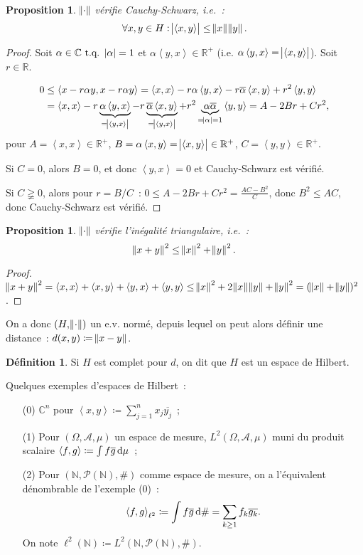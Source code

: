 \documentclass{report}
\newcommand{\C}{{\mathbb C}}
\newcommand{\R}{{\mathbb R}}
\newcommand{\N}{{\mathbb N}}
\newcommand{\scpr}[2]{\left\langle#1, #2\right\rangle}
\newcommand{\tq}{\text{ t.q. }}
\newtheorem{prp}[thm]{Proposition}
\theoremstyle{definition}
\newtheorem{déf}[thm]{Définition}
\theoremstyle{remark}
\begin{document}
\begin{prp} $\norm \cdot$ vérifie Cauchy-Schwarz, i.e.~:
\[\forall x, y \in H : \abs {\scpr xy} \leq \norm x\norm y.\]
\end{prp}

\begin{proof} Soit $\alpha \in \C \tq \abs \alpha = 1$ et $\alpha\scpr yx \in \R^+$ (i.e. $\alpha\scpr yx = \abs {\scpr xy}$). Soit $r \in \R$.

\begin{align*}
	0 &\leq \scpr {x-r\alpha y}{x-r\alpha y} = \scpr xx - r\alpha\scpr yx - r\overline \alpha\scpr xy + r^2\scpr yy \\
		&= \scpr xx - r\underbrace {\alpha \scpr yx}_{= \abs {\scpr yx}} - r\underbrace {\overline \alpha \scpr xy}_{= \abs {\scpr yx}} + r^2\underbrace {\alpha\overline\alpha}_{= \abs \alpha = 1} \scpr yy = A - 2Br + Cr^2,
\end{align*}
pour $A = \scpr xx \in \R^+$, $B = \alpha\scpr xy = \abs {\scpr xy} \in \R^+$, $C = \scpr yy \in \R^+$.

Si $C = 0$, alors $B = 0$, et donc $\scpr yx = 0$ et Cauchy-Schwarz est vérifié.

Si $C \gneqq 0$, alors pour $r = B/C$~: $0 \leq A - 2Br + Cr^2 = \frac {AC-B^2}C$, donc $B^2 \leq AC$, donc Cauchy-Schwarz est vérifié.
\end{proof}

\begin{prp} $\norm \cdot$ vérifie l'inégalité triangulaire, i.e.~:
\[\norm {x+y}^2 \leq \norm x^2 + \norm y^2.\]
\end{prp}

\begin{proof} $\norm {x+y}^2 = \scpr xx + \scpr xy + \scpr yx + \scpr yy \leq \norm x^2 + 2\norm x\norm y + \norm y^2 = (\norm x + \norm y)^2$.
\end{proof}

On a donc $(H, \norm \cdot)$ un e.v. normé, depuis lequel on peut alors définir une distance~: $d(x, y) \coloneqq \norm {x-y}$.

\begin{déf} Si $H$ est complet pour $d$, on dit que $H$ est un espace de Hilbert.
\end{déf}

Quelques exemples d'espaces de Hilbert~:
\begin{itemize}
	\item[(0)] $\C^n$ pour $\scpr xy \coloneqq \sum_{j=1}^nx_j\overline {y_j}$~;
	\item[(1)] Pour $(\Omega, \mathcal A, \mu)$ un espace de mesure, $L^2(\Omega, \mathcal A, \mu)$ muni du produit scalaire $\scpr fg \coloneqq \int f\overline g\dif\mu$~;
	\item[(2)] Pour $(\N, \mathcal P(\N), \#)$ comme espace de mesure, on a l'équivalent dénombrable de l'exemple (0)~:
	\[\scpr fg_{\ell^2} \coloneqq \int f\overline g\dif\# = \sum_{k \geq 1}f_k\overline {g_k}.\]
	On note $\ell^2(\N) \coloneqq L^2(\N, \mathcal P(\N), \#)$.
\end{itemize}
\end{document}
